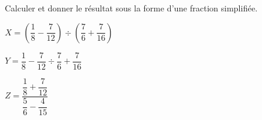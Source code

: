 \begin{exercice*}
    Calculer et donner le résultat sous la forme d'une fraction simplifiée.
        \begin{list}{}{}
            \begin{spacing}{2}
                \item $X = \left(\dfrac18 - \dfrac{7}{12}\right)  \div  \left(\dfrac{7}{6}+\dfrac{7}{16}\right)$
                \item $Y = \dfrac18 - \dfrac{7}{12}  \div  \dfrac{7}{6}+\dfrac{7}{16}$
                \item $Z = \dfrac{\dfrac18 + \dfrac{7}{12}}{\dfrac{5}{6}-\dfrac{4}{15}}$
            \end{spacing}
        \end{list}


\end{exercice*}
